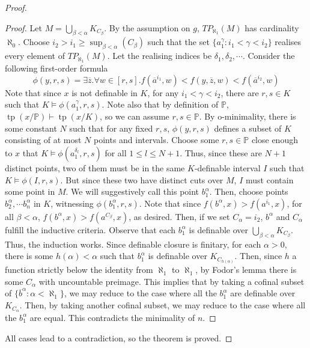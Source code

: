 \documentclass[10pt,a4paper]{amsart}
\newcommand{\bP}{\mathbb P}
\newcommand{\oa}{\overline{a}}
\newcommand{\ob}{\overline{b}}
\newcommand{\oz}{\overline{z}}
\DeclareMathOperator{\tp}{\mathrm{tp}}
\begin{document}
\begin{proof}
\begin{proof}
        Let $M = \bigcup_{\beta<\alpha} K_{C_\beta}$. By the assumption on $g$, $TP_{\aleph_1}(M)$ has cardinality $\aleph_0$.
        Choose $i_2>i_1\geq \sup_{\beta<\alpha}(C_\beta)$ such that the set $\{a_1^{\gamma} : i_1<\gamma<i_2\}$ realises every element of $TP_{\aleph_1}(M)$. Let the realising indices be $\delta_1,\delta_2, \cdots$. Consider the following first-order formula
        \[
        \phi(y,r,s) = \exists \oz. \forall w \in [r,s]. f(\oa^{i_1},w)<f(y,\oz,w)<f(\oa^{i_2},w)
        \]
        Note that since $x$ is not definable in $K$, for any $i_1<\gamma<i_2$, there are $r,s \in K$ such that $K \models \phi(a_1^{\gamma},r,s)$.
        Note also that by definition of $\bP$, $\tp(x/\bP) \vdash \tp(x/K)$, so we can assume $r,s \in \bP$.
        By o-minimality, there is some constant $N$ such that for any fixed $r,s$, $\phi(y,r,s)$ defines a subset of $K$ consisting of at most $N$ points and intervals.
        Choose some $r,s \in \bP$ close enough to $x$ that $K \models \phi(a_1^{\delta_l},r,s)$ for all $1\leq l \leq N+1$. Thus, since these are $N+1$ distinct points, two of them must be in the same $K$-definable interval $I$ such that $K \models \phi(I,r,s)$. But since these two have distinct cuts over $M$, $I$ must contain some point in $M$.
        We will suggestively call this point $b_1^{\alpha}$. Then, choose points $b_2^{\alpha}, \cdots b_n^{\alpha}$ in $K$, witnessing $\phi(b_1^{\alpha},r,s)$. Note that since $f(b^{\alpha},x)>f(a^{i_1},x)$, for all $\beta<\alpha$, $f(b^{\alpha},x)>f(a^{C_\beta},x)$, as desired. Then, if we set $C_\alpha=i_2$, $b^{\alpha}$ and $C_\alpha$ fulfill the inductive criteria.
        Observe that each $b_1^\alpha$ is definable over $\bigcup_{\beta<\alpha} K_{C_\beta}$. Thus, the induction works. Since definable closure is finitary, for each $\alpha>0$, there is some $h(\alpha)<\alpha$ such that $b_1^\alpha$ is definable over $K_{C_{h(\alpha)}}$. Then, since $h$ a function strictly below the identity from $\aleph_1$ to $\aleph_1$, by Fodor's lemma there is some $C_\alpha$ with uncountable preimage.
        This implies that by taking a cofinal subset of $\{\ob^\alpha : \alpha<\aleph_1\}$, we may reduce to the case where all the $b_1^{\alpha}$ are definable over $K_{C_\alpha}$. Then, by taking another cofinal subset, we may reduce to the case where all the $b_1^{\alpha}$ are equal. This contradicts the minimality of $n$.
    \end{proof}
    All cases lead to a contradiction, so the theorem is proved.
\end{proof}
\end{document}
